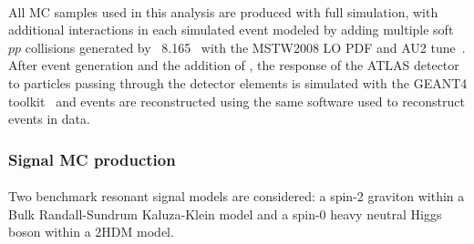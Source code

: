 \paragraph{}
All MC samples used in this analysis are produced with full simulation, with additional \pileup interactions in each simulated event 
modeled by adding multiple soft $pp$ collisions
generated by \Pythia~8.165~\cite{pythia8} with the MSTW2008 LO PDF and AU2 tune~\cite{MC12AU2}.  After event generation and the addition of \pileup, 
the response of the ATLAS detector to particles
passing through the detector elements is simulated with the GEANT4 toolkit~\cite{Geant4,simulation}
and events are reconstructed using the same software used to reconstruct events in data.

\subsubsection{Signal MC production}


\paragraph{}
Two benchmark resonant signal models are considered: a spin-2 graviton within a Bulk Randall-Sundrum Kaluza-Klein model and a spin-0 heavy neutral Higgs boson within a 2HDM model. 

